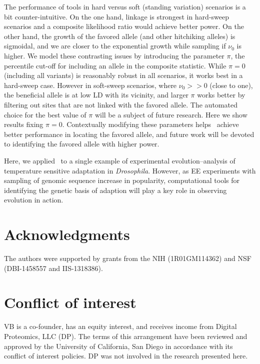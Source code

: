 \documentclass[11pt]{article}
\def\comale{\text{{\sc Comale}}}
\begin{document}
The performance of tools in hard versus soft (standing variation)
scenarios is a bit counter-intuitive. On the one hand, linkage is
strongest in hard-sweep scenarios and a composite likelihood ratio
would achieve better power. On the other hand, the growth of the
favored allele (and other hitchiking alleles) is sigmoidal, and we are
closer to the exponential growth while sampling if $\nu_0$ is
higher. We model these contrasting issues by introducing the parameter
$\pi$, the percentile cut-off for including an allele in the composite
statistic. While $\pi=0$ (including all variants) is reasonably robust
in all scenarios, it works best in a hard-sweep case. However in
soft-sweep scenarios, where $\nu_0>>0$ (close to one), the beneficial
allele is at low LD with its vicinity, and larger $\pi$ works better
by filtering out sites that are not linked with the favored
allele. The automated choice for the best value of $\pi$ will be a
subject of future research. Here we show results fixing
$\pi=0$. Contextually modifying these parameters helps \comale\
achieve better performance in locating the favored allele, and future
work will be devoted to identifying the favored allele with higher
power.

Here, we applied \comale\ to a single example of experimental
evolution--analysis of temperature sensitive adaptation in
\emph{Drosophila}. However, as EE experiments with sampling of genomic
sequence increase in popularity, computational tools for identifying
the genetic basis of adaption will play a key role in observing
evolution in action.
	



\section*{Acknowledgments}
The authors were supported by grants from the NIH (1R01GM114362) and
NSF (DBI-1458557 and IIS-1318386).

\section*{Conflict of interest}
VB is a co-founder, has an equity interest, and receives income from
Digital Proteomics, LLC (DP).  The terms of this arrangement have been
reviewed and approved by the University of California, San Diego in
accordance with its conflict of interest policies.  DP was not
involved in the research presented here.
\clearpage
\newpage
\end{document}
